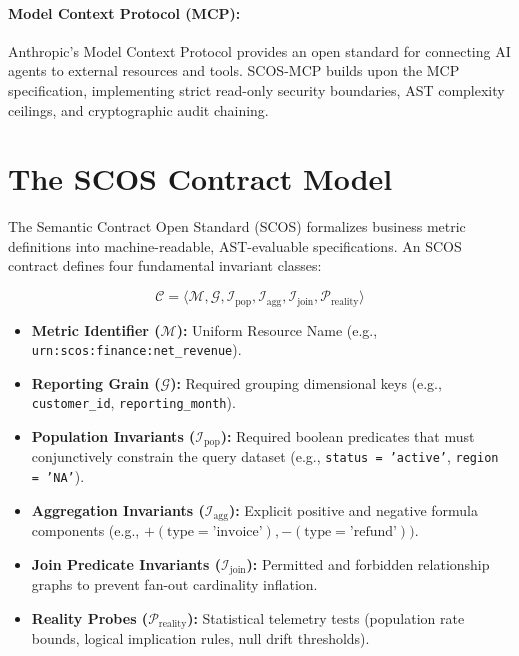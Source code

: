 \documentclass[11pt,a4paper]{article}
\begin{document}
\paragraph{Model Context Protocol (MCP):} Anthropic's Model Context Protocol provides an open standard for connecting AI agents to external resources and tools. SCOS-MCP builds upon the MCP specification, implementing strict read-only security boundaries, AST complexity ceilings, and cryptographic audit chaining.

\section{The SCOS Contract Model}
\label{sec:scos}

The Semantic Contract Open Standard (SCOS) formalizes business metric definitions into machine-readable, AST-evaluable specifications. An SCOS contract defines four fundamental invariant classes:

\begin{equation}
\mathcal{C} = \langle \mathcal{M}, \mathcal{G}, \mathcal{I}_{\text{pop}}, \mathcal{I}_{\text{agg}}, \mathcal{I}_{\text{join}}, \mathcal{P}_{\text{reality}} \rangle
\end{equation}

\begin{itemize}[noitemsep]
    \item \textbf{Metric Identifier ($\mathcal{M}$):} Uniform Resource Name (e.g., \texttt{urn:scos:finance:net\_revenue}).
    \item \textbf{Reporting Grain ($\mathcal{G}$):} Required grouping dimensional keys (e.g., \texttt{customer\_id}, \texttt{reporting\_month}).
    \item \textbf{Population Invariants ($\mathcal{I}_{\text{pop}}$):} Required boolean predicates that must conjunctively constrain the query dataset (e.g., \texttt{status = 'active'}, \texttt{region = 'NA'}).
    \item \textbf{Aggregation Invariants ($\mathcal{I}_{\text{agg}}$):} Explicit positive and negative formula components (e.g., $+(\text{type} = \text{'invoice'}), -(\text{type} = \text{'refund'}))$.
    \item \textbf{Join Predicate Invariants ($\mathcal{I}_{\text{join}}$):} Permitted and forbidden relationship graphs to prevent fan-out cardinality inflation.
    \item \textbf{Reality Probes ($\mathcal{P}_{\text{reality}}$):} Statistical telemetry tests (population rate bounds, logical implication rules, null drift thresholds).
\end{itemize}
\end{document}
